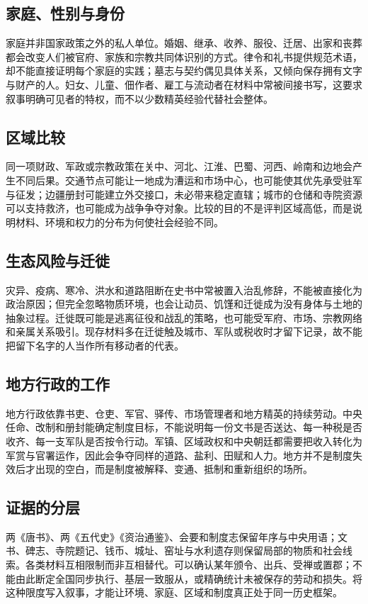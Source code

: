 \subsection{家庭、性别与身份}
家庭并非国家政策之外的私人单位。婚姻、继承、收养、服役、迁居、出家和丧葬都会改变人们被官府、家族和宗教共同体识别的方式。律令和礼书提供规范术语，却不能直接证明每个家庭的实践；墓志与契约偶见具体关系，又倾向保存拥有文字与财产的人。妇女、儿童、佃作者、雇工与流动者在材料中常被间接书写，这要求叙事明确可见者的特权，而不以少数精英经验代替社会整体。

\subsection{区域比较}
同一项财政、军政或宗教政策在关中、河北、江淮、巴蜀、河西、岭南和边地会产生不同后果。交通节点可能让一地成为漕运和市场中心，也可能使其优先承受驻军与征发；边疆册封可能建立外交接口，未必带来稳定直辖；城市的仓储和寺院资源可以支持救济，也可能成为战争争夺对象。比较的目的不是评判区域高低，而是说明材料、环境和权力的分布为何使社会经验不同。

\subsection{生态风险与迁徙}
灾异、疫病、寒冷、洪水和道路阻断在史书中常被置入治乱修辞，不能被直接化为政治原因；但完全忽略物质环境，也会让动员、饥馑和迁徙成为没有身体与土地的抽象过程。迁徙既可能是逃离征役和战乱的策略，也可能受军府、市场、宗教网络和亲属关系吸引。现存材料多在迁徙触及城市、军队或税收时才留下记录，故不能把留下名字的人当作所有移动者的代表。

\subsection{地方行政的工作}
地方行政依靠书吏、仓吏、军官、驿传、市场管理者和地方精英的持续劳动。中央任命、改制和册封能确定制度目标，不能说明每一份文书是否送达、每一种税是否收齐、每一支军队是否按令行动。军镇、区域政权和中央朝廷都需要把收入转化为军赏与官署运作，因此会争夺同样的道路、盐利、田赋和人力。地方并不是制度失效后才出现的空白，而是制度被解释、变通、抵制和重新组织的场所。

\subsection{证据的分层}
两《唐书》、两《五代史》《资治通鉴》、会要和制度志保留年序与中央用语；文书、碑志、寺院题记、钱币、城址、窑址与水利遗存则保留局部的物质和社会线索。各类材料互相限制而非互相替代。可以确认某年颁令、出兵、受禅或置郡；不能由此断定全国同步执行、基层一致服从，或精确统计未被保存的劳动和损失。将这种限度写入叙事，才能让环境、家庭、区域和制度真正处于同一历史框架。
